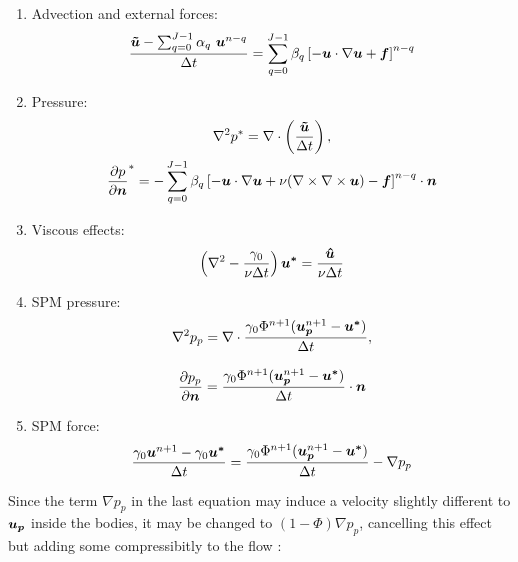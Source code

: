 \begin{enumerate}
    \item Advection and external forces:
        \begin{equation}
            \frac{\boldsymbol{\tilde{u}}-\sum_{q=0}^{J-1}\alpha_q~\boldsymbol{u}^{n-q}}{\Delta t} = \sum_{q=0}^{J-1}\beta_q\left[-\boldsymbol{u}\cdot\nabla\boldsymbol{u}+\boldsymbol{f}\right]^{n-q}
        \end{equation}
    \item Pressure:
        \begin{subequations}
        \begin{gather}
            \nabla^2 p^* = \nabla\cdot\left(\frac{\boldsymbol{\tilde{u}}}{\Delta t}\right),\\
            \frac{\partial p}{\partial \boldsymbol{n}}^* = -\sum_{q=0}^{J-1}\beta_q\left[-\boldsymbol{u}\cdot\nabla\boldsymbol{u}+\nu(\nabla\times\nabla\times\boldsymbol{u})-\boldsymbol{f}\right]^{n-q}\cdot\boldsymbol{n}
        \end{gather}
        \end{subequations}
    \item Viscous effects:
        \begin{equation}
            \left(\nabla^2 - \frac{\gamma_0}{\nu\Delta t}\right)\boldsymbol{u^*} = \frac{\boldsymbol{\hat{u}}}{\nu\Delta t}
        \end{equation}
    \item SPM pressure:
        \begin{subequations}
        \begin{gather}
            \nabla^2 p_p = \nabla\cdot\frac{\gamma_0\Phi^{n+1}(\boldsymbol{u_p}^{n+1}-\boldsymbol{u^*})}{\Delta t},\\[3mm]
            \frac{\partial p_p}{\partial \boldsymbol{n}} = \frac{\gamma_0\Phi^{n+1}(\boldsymbol{u_p}^{n+1}-\boldsymbol{u^*})}{\Delta t}\cdot\boldsymbol{n}
        \end{gather}
        \end{subequations}
    \item SPM force:
        \begin{equation} \label{eq:SPM:incompressiblePressure}
            \frac{\gamma_0\boldsymbol{u}^{n+1}-\gamma_0\boldsymbol{u^*}}{\Delta t} = \frac{\gamma_0\Phi^{n+1}(\boldsymbol{u_p}^{n+1}-\boldsymbol{u^*})}{\Delta t} - \nabla p_p
        \end{equation}
\end{enumerate}

Since the term $\nabla p_p$ in the last equation may induce a velocity slightly different to $\boldsymbol{u_p}$ inside the bodies, it may be changed to $(1-\Phi)\nabla p_p$, cancelling this effect but adding some compressibitly to the flow \cite{LuoSPM}:

